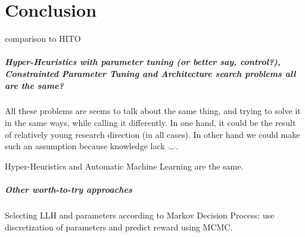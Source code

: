 \chapter{Conclusion}
comparison to HITO~\cite{guizzo2015hyper}


\paragraph{Hyper-Heuristics with parameter tuning (or better say, control?), Constrainted Parameter Tuning and Architecture search problems all are the same?}
All these problems are seems to talk about the same thing, and trying to solve it in the same ways, while calling it differently. In one hand, it could be the result of relatively young research direction (in all cases). In other hand we could make such an assumption because knowledge lack $\smile$.

Hyper-Heuristics and Automatic Machine Learning are the same.

\paragraph{Other worth-to-try approaches}
Selecting LLH and parameters according to Markov Decision Process: use discretization of parameters and predict reward using MCMC.